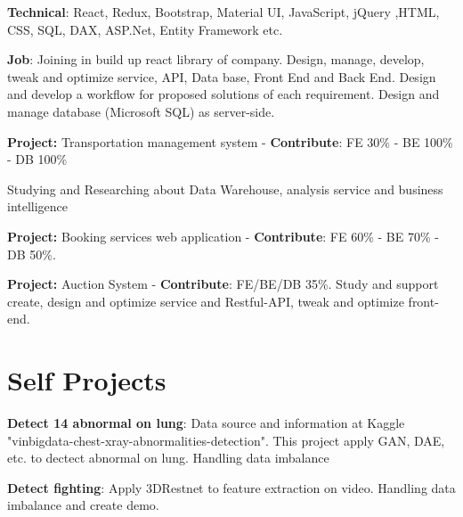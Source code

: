 \documentclass[]{plushcv}
\begin{document}
\begin{minipage}[t]{0.70\textwidth}
\begin{tightemize}
\sectionsep
\item \textbf{Technical}: React, Redux, Bootstrap, Material UI, JavaScript, jQuery ,HTML, CSS, SQL, DAX, ASP.Net, Entity Framework etc.
\item \textbf{Job}: Joining in build up react library of company. Design, manage, develop, tweak and optimize service, API, Data base, Front End and Back End. Design and develop a workflow for proposed solutions of each requirement. Design and manage database (Microsoft SQL)  as server-side.
\item {\textbf{Project:} Transportation management system - \textbf{Contribute}: FE 30\% - BE 100\% - DB 100\%}
\item {Studying and Researching about Data Warehouse, analysis service and business intelligence}
\item {\textbf{Project:} Booking services  web application - \textbf{Contribute}: FE 60\% - BE 70\% - DB 50\%}.
\item {\textbf{Project:} Auction System - \textbf{Contribute}: FE/BE/DB 35\%}. Study and support create, design and optimize service and Restful-API, tweak and optimize front-end.
\end{tightemize}
\sectionsep



\section{Self Projects}
\begin{tightemize}
\item {\textbf{Detect 14 abnormal on lung}: Data source and information at Kaggle "vinbigdata-chest-xray-abnormalities-detection". This project apply GAN, DAE, etc. to dectect abnormal on lung. Handling data imbalance}
\item{\textbf{Detect fighting}: Apply 3DRestnet to feature extraction on video. Handling data imbalance and create demo.}
\end{tightemize}
\sectionsep


%
%

\end{minipage} 
\end{document}
